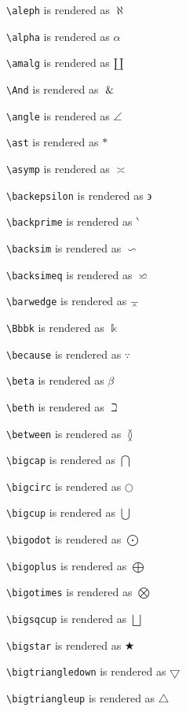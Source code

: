 \texttt{\textbackslash aleph} is rendered as $\aleph$


\texttt{\textbackslash alpha} is rendered as $\alpha$


\texttt{\textbackslash amalg} is rendered as $\amalg$


\texttt{\textbackslash And} is rendered as $\And$


\texttt{\textbackslash angle} is rendered as $\angle$


\texttt{\textbackslash ast} is rendered as $\ast$


\texttt{\textbackslash asymp} is rendered as $\asymp$


\texttt{\textbackslash backepsilon} is rendered as $\backepsilon$


\texttt{\textbackslash backprime} is rendered as $\backprime$


\texttt{\textbackslash backsim} is rendered as $\backsim$


\texttt{\textbackslash backsimeq} is rendered as $\backsimeq$


\texttt{\textbackslash barwedge} is rendered as $\barwedge$


\texttt{\textbackslash Bbbk} is rendered as $\Bbbk$


\texttt{\textbackslash because} is rendered as $\because$


\texttt{\textbackslash beta} is rendered as $\beta$


\texttt{\textbackslash beth} is rendered as $\beth$


\texttt{\textbackslash between} is rendered as $\between$


\texttt{\textbackslash bigcap} is rendered as $\bigcap$


\texttt{\textbackslash bigcirc} is rendered as $\bigcirc$


\texttt{\textbackslash bigcup} is rendered as $\bigcup$


\texttt{\textbackslash bigodot} is rendered as $\bigodot$


\texttt{\textbackslash bigoplus} is rendered as $\bigoplus$


\texttt{\textbackslash bigotimes} is rendered as $\bigotimes$


\texttt{\textbackslash bigsqcup} is rendered as $\bigsqcup$


\texttt{\textbackslash bigstar} is rendered as $\bigstar$


\texttt{\textbackslash bigtriangledown} is rendered as $\bigtriangledown$


\texttt{\textbackslash bigtriangleup} is rendered as $\bigtriangleup$


